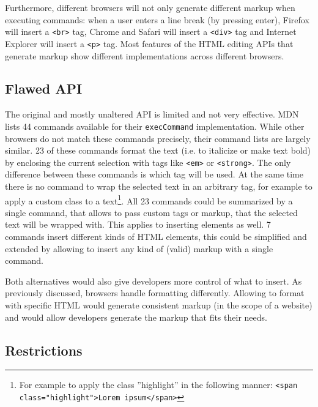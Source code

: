 Furthermore, different browsers will not only generate different markup when executing commands: when a user enters a line break (by pressing enter), Firefox will insert a \texttt{<br>} tag, Chrome and Safari will insert a \texttt{<div>} tag and Internet Explorer will insert a \texttt{<p>} tag. Most features of the HTML editing APIs that generate markup show different implementations across different browsers.


\subsection{Flawed API} 
\label{subsec:flawed_api}

The original and mostly unaltered API is limited and not very effective. MDN lists 44 commands available for their \texttt{execCommand} implementation\cite{bc}. While other browsers do not match these commands precisely, their command lists are largely similar. 23 of these commands format the text (i.e. to italicize or make text bold) by enclosing the current selection with tags like \texttt{<em>} or \texttt{<strong>}. The only difference between these commands is which tag will be used. At the same time there is no command to wrap the selected text in an arbitrary tag, for example to apply a custom class to a text\footnote{For example to apply the  class ''highlight'' in the following manner: \texttt{<span class="highlight">Lorem ipsum</span>}}. All 23 commands could be summarized by a single command, that allows to pass custom tags or markup, that the selected text will be wrapped with. This applies to inserting elements as well. 7 commands insert different kinds of HTML elements, this could be simplified and extended by allowing to insert any kind of (valid) markup with a single command. 


Both alternatives would also give developers more control of what to insert. As previously discussed, browsers handle formatting differently. Allowing to format with specific HTML would generate consistent markup (in the scope of a website) and would allow developers generate the markup that fits their needs.


\subsection{Restrictions}

